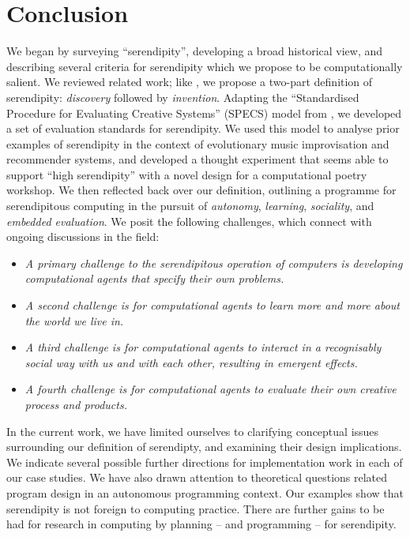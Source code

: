 \section{Conclusion} \label{sec:conclusion}

%
We began by surveying ``serendipity'', developing a broad historical
view, and describing several criteria for serendipity which we propose
to be computationally salient.  We reviewed related work; like
, we propose a two-part definition of
serendipity: \emph{discovery} followed by \emph{invention}.
%
Adapting the ``Standardised Procedure for Evaluating Creative
Systems'' (SPECS) model from , we developed a set
of evaluation standards for serendipity.
%
We used this model to analyse prior examples of serendipity in the
context of evolutionary music improvisation and recommender systems,
and developed a thought experiment that seems able to support ``high
serendipity'' with a novel design for a computational poetry workshop.
%
We then reflected back over our definition, outlining a programme for
serendipitous computing in the pursuit of \emph{autonomy},
\emph{learning}, \emph{sociality}, and \emph{embedded evaluation}.  We
posit the following challenges, which connect with ongoing discussions
in the field:
%
\begin{itemize}
\item \emph{A primary challenge to the serendipitous operation of
  computers is developing computational agents that specify their own
  problems.}
\item \emph{A second challenge is for computational agents to learn
  more and more about the world we live in.}
\item \emph{A third challenge is for computational agents to interact
  in a recognisably social way with us and with each other, resulting
  in emergent effects.}
\item \emph{A fourth challenge is for computational agents to evaluate
  their own creative process and products.}
\end{itemize}
%
In the current work, we have limited ourselves to clarifying
conceptual issues surrounding our definition of serendipty, and
examining their design implications.
% 
We indicate several possible further directions for implementation
work in each of our case studies.  We have also drawn attention to
theoretical questions related program design in an autonomous
programming context.  Our examples show that serendipity is not
foreign to computing practice.  There are further gains to be had for
research in computing by planning -- and programming -- for
serendipity.
%

